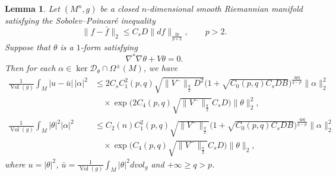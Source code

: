 \documentclass[12pt, twoside]{article}
\newtheorem{lemma}[theorem]{Lemma}
\theoremstyle{definition}
\numberwithin{equation}{section}
\begin{document}
	\begin{lemma}\label{lem:key-estimates}
		Let \((M^{n},g)\) be a closed \(n\)-dimensional smooth Riemannian manifold satisfying the Sobolev--Poincar\'e inequality
		\[
		\|f-\bar{f}\|_{2}\le C_{s}D\|df\|_{\frac{2p}{p+2}},\qquad p>2.
		\]		
		Suppose that \(\theta\) is a \(1\)-form satisfying
		\[
		\nabla^{*}\nabla\theta+V\theta=0.
		\]
		Then for each \(\alpha\in\ker\mathcal{D}_{\theta}\cap\Omega^{\pm}(M)\), we have	
		\begin{align}
		\frac{1}{\operatorname{Vol}(g)}\int_{M}|u-\bar{u}|\,|\alpha|^{2}
		&\le 2C_{s}C^2_1(p,q)\sqrt{\|V^{-}\|_{\frac{q}{2}}D^{2}}\bigl(1+\sqrt{C_{0}(p,q)C_{s}DB}\bigr)^{\frac{4pq}{q-p}}\|\alpha\|_{2}^{2}\nonumber\\
		&\quad\times\exp\bigl(2C_4(p,q)\sqrt{\|V^{-}\|_{\frac{q}{2}}}C_{s}D\bigr)\|\theta\|_{2}^{2},\label{eq:mean-oscillation-estimate}\\
		\frac{1}{\operatorname{Vol}(g)}\int_{M}|\theta|^{2}|\alpha|^{2}
		&\le C_{2}(n) C^2_1(p,q) \sqrt{\|V^{-}\|_{\frac{q}{2}}} \bigl(1+\sqrt{C_{0}(p,q)C_{s}DB}\bigr)^{\frac{4pq}{q-p}}\|\alpha\|_{2}^{2}\nonumber\\
		&\quad\times\exp\bigl(C_4(p,q)\sqrt{\|V^{-}\|_{\frac{q}{2}}}C_{s}D\bigr)\|\theta\|_{2},\label{eq:theta-square-estimate}
		\end{align}
		where 
		\(u=|\theta|^{2}\), 
		\(\bar{u}=\frac{1}{\operatorname{Vol}(g)}\int_{M}|\theta|^{2}dvol_{g}\) and $+\infty\geq q>p$.
	\end{lemma}	
\end{document}

